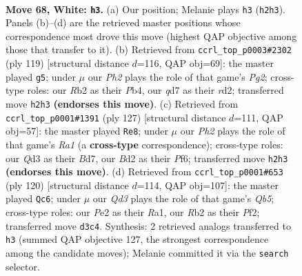 \documentclass[11pt]{article}
\begin{document}
\clearpage

\begin{figure}[p]\centering
\begin{subfigure}{0.46\textwidth}\centering
\resizebox{\linewidth}{!}{%
\newchessgame
\chessboard[
  setfen={5r2/3qbk2/5n2/P1p2p1p/3p1Pp1/3Q4/1R1BPK1P/3N4 w - - 11 68},
  showmover=false,
  pgfstyle=straightmove, color=movearrow, markmove={h2-h3}
]}
\caption{}
\end{subfigure}\hfill
\begin{subfigure}{0.46\textwidth}\centering
\resizebox{\linewidth}{!}{%
\newchessgame
\chessboard[
  setfen={5k2/1p4p1/5p1p/3q1b2/1p1P3P/1P3P2/P2RQ1P1/2r1N1K1 b - - 0 60},
  showmover=false,
  pgfstyle=straightmove, color=movearrow, markmove={g7-g5}
]}
\caption{}
\end{subfigure}
\\[4pt]
\begin{subfigure}{0.46\textwidth}\centering
\resizebox{\linewidth}{!}{%
\newchessgame
\chessboard[
  setfen={r6k/3b4/1p2pp1q/1P1p3P/3P1P1n/4Q1N1/4B2K/5R2 b - - 15 64},
  showmover=false,
  pgfstyle=straightmove, color=movearrow, markmove={a8-e8}
]}
\caption{}
\end{subfigure}\hfill
\begin{subfigure}{0.46\textwidth}\centering
\resizebox{\linewidth}{!}{%
\newchessgame
\chessboard[
  setfen={1q1b4/r4pk1/Pp5p/1Qp1pPpP/4P3/3B4/5PK1/R7 w - - 0 61},
  showmover=false,
  pgfstyle=straightmove, color=movearrow, markmove={b5-c6}
]}
\caption{}
\end{subfigure}
\caption{\textbf{Move 68, White: \texttt{h3}.} (a) Our position; Melanie plays \texttt{h3} (\texttt{h2h3}). Panels (b)--(d) are the retrieved master positions whose correspondence most drove this move (highest QAP objective among those that transfer to it). (b) Retrieved from \texttt{ccrl\_top\_p0003\#2302} (ply 119) [structural distance $d$=116, QAP obj=69]: the master played \texttt{g5}; under $\mu$ our \emph{Ph2} plays the role of that game's \emph{Pg2}; cross-type roles: our \emph{R}b2 as their \emph{P}b4, our \emph{q}d7 as their \emph{r}d2; transferred move \texttt{h2h3} \textbf{(endorses this move)}. (c) Retrieved from \texttt{ccrl\_top\_p0001\#1391} (ply 127) [structural distance $d$=111, QAP obj=57]: the master played \texttt{Re8}; under $\mu$ our \emph{Ph2} plays the role of that game's \emph{Ra1} (a \textbf{cross-type} correspondence); cross-type roles: our \emph{Q}d3 as their \emph{B}d7, our \emph{B}d2 as their \emph{P}f6; transferred move \texttt{h2h3} \textbf{(endorses this move)}. (d) Retrieved from \texttt{ccrl\_top\_p0001\#653} (ply 120) [structural distance $d$=114, QAP obj=107]: the master played \texttt{Qc6}; under $\mu$ our \emph{Qd3} plays the role of that game's \emph{Qb5}; cross-type roles: our \emph{P}e2 as their \emph{R}a1, our \emph{R}b2 as their \emph{P}f2; transferred move \texttt{d3c4}. Synthesis: 2 retrieved analogs transferred to \texttt{h3} (summed QAP objective 127, the strongest correspondence among the candidate moves); Melanie committed it via the \texttt{search} selector.}
\label{fig:thought-m134}
\end{figure}
\end{document}
